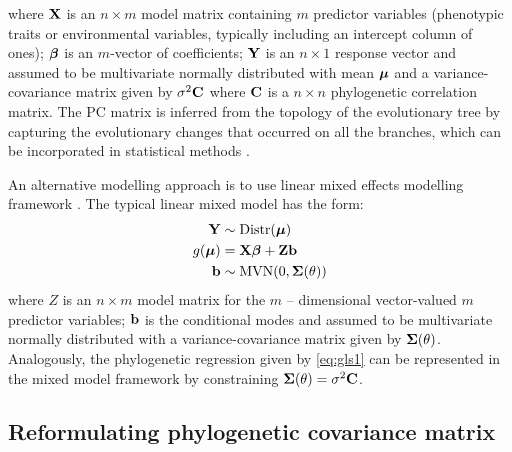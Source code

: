 where ${\mathbf X}$ is an $n \times m$ model matrix containing $m$ predictor variables (phenotypic traits or environmental variables, typically including an intercept column of ones); ${\boldsymbol \beta}$ is an $m$-vector of coefficients; ${\mathbf Y}$ is an $n \times 1$ response vector and assumed to be multivariate normally distributed with mean ${\boldsymbol \mu}$ and a variance-covariance matrix given by $\sigma^{2} {\mathbf C}$ where ${\mathbf C}$ is a $n \times n$ phylogenetic correlation matrix.
The PC matrix is inferred from the topology of the evolutionary tree by capturing the evolutionary changes that occurred on all the branches, which can be incorporated in statistical methods \citep{garamszegi2014modern}.


An alternative modelling approach is to use linear mixed effects modelling framework \citep{lynch1991methods}.
The typical linear mixed model has the form:
\begin{align}
{\mathbf Y} & \sim \textrm{Distr}({\boldsymbol \mu}) \label{eq:glmm1} \\
g({\boldsymbol \mu}) & = {\mathbf X} {\boldsymbol \beta} + {\mathbf Z} {\mathbf b} \label{eq:glmm2} \\
{\mathbf b} & \sim \textrm{MVN}(0, {\boldsymbol \Sigma}(\theta)) \label{eq:glmm3}
\end{align}
where $Z$ is an $n \times m$ model matrix for the $m$ -- dimensional vector-valued $m$ predictor variables; ${\mathbf b}$ is the conditional modes and assumed to be multivariate normally distributed with a variance-covariance matrix given by ${\boldsymbol \Sigma}(\theta)$.
Analogously, the phylogenetic regression given by \ref{eq:gls1} can be represented in the mixed model framework by constraining ${\boldsymbol \Sigma}(\theta) = \sigma^2 {\mathbf C}$.


\subsection{Reformulating phylogenetic covariance matrix}


